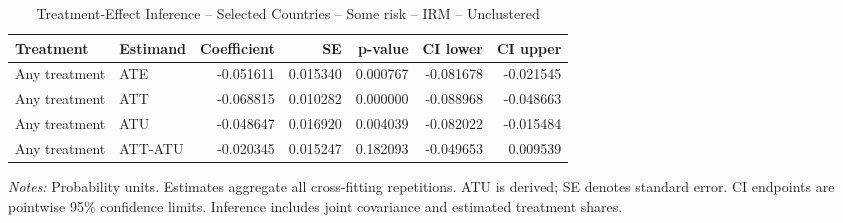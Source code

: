 \begin{table}[htbp]
\centering
\caption{Treatment-Effect Inference -- Selected Countries -- Some risk -- IRM -- Unclustered}
\label{tab:inference-SomeRiskHome-IRM-iid-selected-countries}
\scriptsize
\begin{adjustbox}{max width=\linewidth}
\begin{tabular}{llrrrrr}
\toprule
Treatment & Estimand & Coefficient & SE & p-value & CI lower & CI upper \\
\midrule
Any treatment & ATE & -0.051611 & 0.015340 & 0.000767 & -0.081678 & -0.021545 \\
Any treatment & ATT & -0.068815 & 0.010282 & 0.000000 & -0.088968 & -0.048663 \\
Any treatment & ATU & -0.048647 & 0.016920 & 0.004039 & -0.082022 & -0.015484 \\
Any treatment & ATT-ATU & -0.020345 & 0.015247 & 0.182093 & -0.049653 & 0.009539 \\
\bottomrule
\end{tabular}

\end{adjustbox}
\par\smallskip
\begin{minipage}{\linewidth}\scriptsize \textit{Notes:} Probability units. Estimates aggregate all cross-fitting repetitions. ATU is derived; SE denotes standard error. CI endpoints are pointwise 95\% confidence limits. Inference includes joint covariance and estimated treatment shares. \end{minipage}
\end{table}

